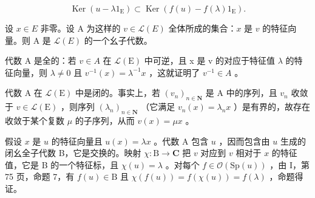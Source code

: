\[
\operatorname{Ker} (u - \lambda 1 _ {\mathrm{E}}) \subset \operatorname{Ker} (f (u) - f (\lambda) 1 _ {\mathrm{E}}).
\]

设 \(x \in E\) 非零。设 A 为这样的 \(v \in \mathcal{L}(E)\) 全体所成的集合：\(x\) 是 \(v\) 的特征向量。则 A 是 \(\mathcal{L}(E)\) 的一个幺子代数。

代数 A 是全的：若 \(v \in A\) 在 \(\mathcal{L}(\mathrm{E})\) 中可逆，且 x 是 v 的对应于特征值 \(\lambda\) 的特征向量，则 \(\lambda \neq 0\) 且 \(v^{-1}(x) = \lambda^{-1}x\) ，这就证明了 \(v^{-1} \in A\) 。

代数 A 在 \(\mathcal{L}(\mathrm{E})\) 中是闭的。事实上，若 \((v_n)_{n\in \mathbf{N}}\) 是 A 中的序列，且 \(v_{n}\) 收敛于 \(v\in \mathcal{L}(\mathrm{E})\) ，则序列 \((\lambda_{n})_{n\in \mathbf{N}}\) （它满足 \(v_{n}(x) = \lambda_{n}x\) ）是有界的，故存在收敛于某个复数 \(\mu\) 的子序列，从而 \(v(x) = \mu x\) 。

假设 \(x\) 是 \(u\) 的特征向量且 \(u(x) = \lambda x\) 。代数 A 包含 \(u\) ，因而包含由 \(u\) 生成的闭幺全子代数 B，它是交换的。映射 \(\chi \colon \mathrm{B} \to \mathbf{C}\) 把 \(v\) 对应到 \(v\) 相对于 \(x\) 的特征值，它是 B 的一个特征标，且 \(\chi(u) = \lambda\) 。对每个 \(f \in \mathcal{O}(\mathrm{Sp}(u))\) ，由 I，第 75 页，命题 7，有 \(f(u) \in \mathrm{B}\) 且 \(\chi(f(u)) = f(\chi(u)) = f(\lambda)\) ，命题得证。

